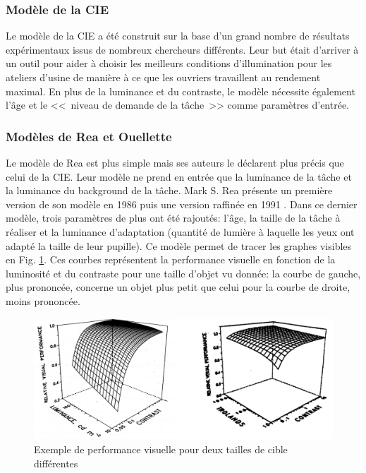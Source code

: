 	\subsubsection{Modèle de la CIE}
	\par Le modèle de la CIE a été construit sur la base d'un grand nombre de résultats expérimentaux issus de nombreux chercheurs différents. Leur but était d'arriver à un outil pour aider à choisir les meilleurs conditions d'illumination pour les ateliers d'usine de manière à ce que les ouvriers travaillent au rendement maximal. En plus de la luminance et du contraste, le modèle nécessite également l'âge et le <<~niveau de demande de la tâche~>> comme paramètres d'entrée.
	
	\subsubsection{Modèles de Rea et Ouellette}
	\par Le modèle de Rea est plus simple mais ses auteurs le déclarent plus précis que celui de la CIE. Leur modèle ne prend en entrée que la luminance de la tâche et la luminance du background de la tâche. Mark S. Rea présente un première version de son modèle en 1986 \citep{rea_toward_1986} puis une version raffinée en 1991 \citep{rea_relative_1991}. Dans ce dernier modèle, trois paramètres de plus ont été rajoutés: l'âge, la taille de la tâche à réaliser et la luminance d'adaptation (quantité de lumière à laquelle les yeux ont adapté la taille de leur pupille). Ce modèle permet de tracer les graphes visibles en Fig. \ref{fig:courbes_rea}. Ces courbes représentent la performance visuelle en fonction de la luminosité et du contraste pour une taille d'objet vu donnée: la courbe de gauche, plus prononcée, concerne un objet plus petit que celui pour la courbe de droite, moins prononcée.
	
	\begin{figure}
		\centering
		\includegraphics[scale=.5]{Figures/CourbesReaExemple}
		\caption{Exemple de performance visuelle pour deux tailles de cible différentes}
		\label{fig:courbes_rea}
	\end{figure}
	
